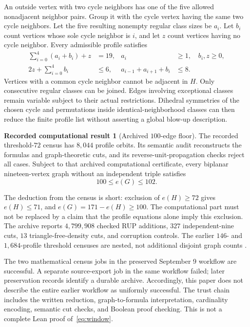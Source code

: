 \documentclass[11pt,letterpaper]{article}
\theoremstyle{definition}
\newtheorem{result}[theorem]{Recorded computational result}
\theoremstyle{remark}\newtheorem{remark}[theorem]{Remark}
\begin{document}
An outside vertex with two cycle neighbors has one of the five allowed nonadjacent neighbor pairs. Group it with the cycle vertex having the same two cycle neighbors. Let the five resulting nonempty regular class sizes be $a_i$. Let $b_i$ count vertices whose sole cycle neighbor is $i$, and let $z$ count vertices having no cycle neighbor. Every admissible profile satisfies
\begin{align}
\sum_{i=0}^4(a_i+b_i)+z&=19, & a_i&\geq1,\quad b_i,z\geq0,\\
2z+\sum_{i=0}^4b_i&\leq6, & a_{i-1}+a_{i+1}+b_i&\leq8.
\end{align}
Vertices with a common cycle neighbor cannot be adjacent in $H$. Only consecutive regular classes can be joined. Edges involving exceptional classes remain variable subject to their actual restrictions. Dihedral symmetries of the chosen cycle and permutations inside identical-neighborhood classes can then reduce the finite profile list without asserting a global blow-up description.

\begin{result}[Archived $100$-edge floor]\label{res:100}
The recorded threshold-$72$ census has $8,044$ profile orbits. Its semantic audit reconstructs the formulas and graph-theoretic cuts, and its reverse-unit-propagation checks reject all cases. Subject to that archived computational certificate, every biplanar nineteen-vertex graph without an independent triple satisfies
\begin{equation}\label{eq:window}
100\leq e(G)\leq102.
\end{equation}
\end{result}
The deduction from the census is short: exclusion of $e(H)\geq72$ gives $e(H)\leq71$, and $e(G)=171-e(H)\geq100$. The computational part must not be replaced by a claim that the profile equations alone imply this exclusion. The archive reports $4,799,908$ checked RUP additions, $327$ independent-nine cuts, $13$ triangle-free-density cuts, and corruption controls. The earlier $146$- and $1,684$-profile threshold censuses are nested, not additional disjoint graph counts \cite{BeasleyC5}.

The two mathematical census jobs in the preserved September 9 workflow are successful. A separate source-export job in the same workflow failed; later preservation records identify a durable archive. Accordingly, this paper does not describe the entire earlier workflow as uniformly successful. The trust chain includes the written reduction, graph-to-formula interpretation, cardinality encoding, semantic cut checks, and Boolean proof checking. This is not a complete Lean proof of~\eqref{eq:window}.
\end{document}
